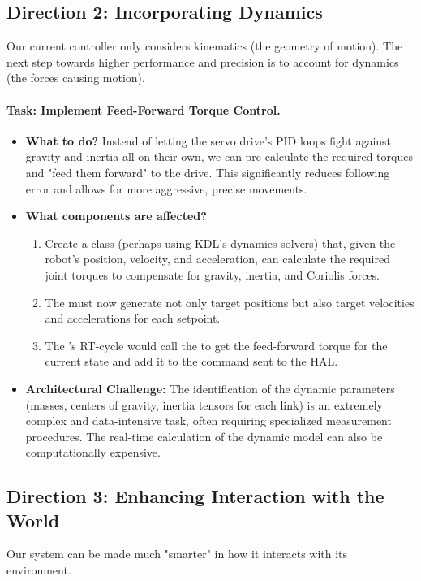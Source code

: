 \subsection{Direction 2: Incorporating Dynamics}
\label{subsec:dev_path_dynamics}
Our current controller only considers kinematics (the geometry of motion). The next step towards higher performance and precision is to account for dynamics (the forces causing motion).

\paragraph{Task: Implement Feed-Forward Torque Control.}
\begin{itemize}
    \item \textbf{What to do?} Instead of letting the servo drive's PID loops fight against gravity and inertia all on their own, we can pre-calculate the required torques and "feed them forward" to the drive. This significantly reduces following error and allows for more aggressive, precise movements.
    \item \textbf{What components are affected?}
        \begin{enumerate}
            \item Create a  class (perhaps using KDL's dynamics solvers) that, given the robot's position, velocity, and acceleration, can calculate the required joint torques to compensate for gravity, inertia, and Coriolis forces.
            \item The  must now generate not only target positions but also target velocities and accelerations for each setpoint.
            \item The 's RT-cycle would call the  to get the feed-forward torque for the current state and add it to the command sent to the HAL.
        \end{enumerate}
    \item \textbf{Architectural Challenge:} The identification of the dynamic parameters (masses, centers of gravity, inertia tensors for each link) is an extremely complex and data-intensive task, often requiring specialized measurement procedures. The real-time calculation of the dynamic model can also be computationally expensive.
\end{itemize}

\subsection{Direction 3: Enhancing Interaction with the World}
\label{subsec:dev_path_interaction}
Our system can be made much "smarter" in how it interacts with its environment.

